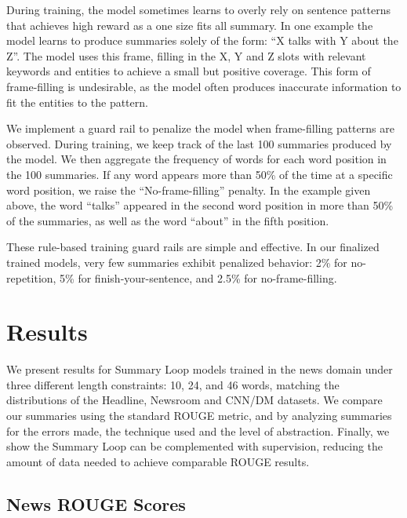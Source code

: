 \documentclass[11pt,a4paper]{article}
\begin{document}
During training, the model sometimes learns to overly rely on sentence patterns that achieves high reward as a one size fits all summary. In one example the model learns to produce summaries solely of the form: ``X talks with Y about the Z''. The model uses this frame, filling in the X, Y and Z slots with relevant keywords and entities to achieve a small but positive coverage. This form of frame-filling is undesirable, as the model often produces inaccurate information to fit the entities to the pattern.

We implement a guard rail to penalize the model when frame-filling patterns are observed. During training, we keep track of the last 100 summaries produced by the model. We then aggregate the frequency of words for each word position in the 100 summaries. If any word appears more than 50\% of the time at a specific word position, we raise the ``No-frame-filling'' penalty. In the example given above, the word ``talks'' appeared in the second word position in more than 50\% of the summaries, as well as the word ``about'' in the fifth position.


These rule-based training guard rails are simple and effective. In our finalized trained models, very few summaries exhibit penalized behavior: 2\% for no-repetition, 5\% for finish-your-sentence, and 2.5\% for no-frame-filling.

\section{Results}
\label{section:results}
We present results for Summary Loop models trained in the news domain under three different length constraints: 10, 24, and 46 words, matching the distributions of the Headline, Newsroom \cite{grusky2018newsroom} and CNN/DM \cite{nallapati2016abstractive} datasets. We compare our summaries using the standard ROUGE metric, and by analyzing summaries for the errors made, the technique used and the level of abstraction. Finally, we show the Summary Loop can be complemented with supervision, reducing the amount of data needed to achieve comparable ROUGE results.

\subsection{News ROUGE Scores}
\end{document}
